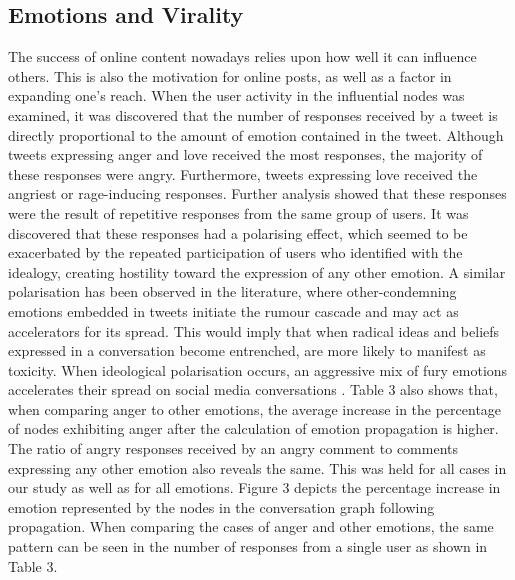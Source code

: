 \documentclass[acmtog]{acmart}
\begin{document}
\subsection{Emotions and Virality}
The success of online content nowadays relies upon how well it can influence others. This is also the motivation for online posts, as well as a factor in expanding one's reach. When the user activity in the influential nodes was examined, it was discovered that the number of responses received by a tweet is directly proportional to the amount of emotion contained in the tweet. Although tweets expressing anger and love received the most responses, the majority of these responses were angry. Furthermore, tweets expressing love received the angriest or rage-inducing responses. Further analysis showed that these responses were the result of repetitive responses from the same group of users. It was discovered that these responses had a polarising effect, which seemed to be exacerbated by the repeated participation of users who identified with the idealogy, creating hostility toward the expression of any other emotion. A similar polarisation has been observed in the literature, where other-condemning emotions embedded in tweets initiate the rumour cascade and may act as accelerators for its spread. This would imply that when radical ideas and beliefs expressed in a conversation become entrenched, are more likely to manifest as toxicity. When ideological polarisation occurs, an aggressive mix of fury emotions accelerates their spread on social media conversations \cite{solovev2022moral}. Table 3 also shows that, when comparing anger to other emotions, the average increase in the percentage of nodes exhibiting anger after the calculation of emotion propagation is higher. The ratio of angry responses received by an angry comment to comments expressing any other emotion also reveals the same. This was held for all cases in our study as well as for all emotions. Figure 3 depicts the percentage increase in emotion represented by the nodes in the conversation graph following propagation. When comparing the cases of anger and other emotions, the same pattern can be seen in the number of responses from a single user as shown in Table 3.
\end{document}
